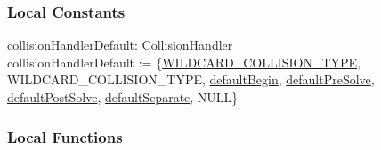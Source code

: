 \documentclass[12pt]{article}
\newcommand{\funcPadding}{1.3}
\begin{document}
\subsubsection{Local Constants} \label{SecLCSpace}
	collisionHandlerDefault: CollisionHandler \\
	collisionHandlerDefault := \{\hyperref[SecECControl]{WILDCARD_COLLISION_TYPE}, WILDCARD_COLLISION_TYPE, \hyperref[SecLFSpace]{defaultBegin}, \hyperref[SecLFSpace]{defaultPreSolve}, \hyperref[SecLFSpace]{defaultPostSolve}, \hyperref[SecLFSpace]{defaultSeparate}, NULL\}

\subsubsection{Local Functions} \label{SecLFSpace}

\renewcommand*{\arraystretch}{\funcPadding}
\end{document}

